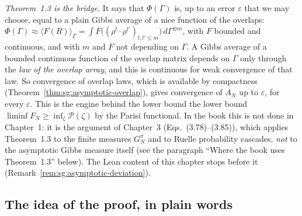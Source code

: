 \emph{Theorem~1.3 is the bridge.} It says that $\Phi(\Gamma)$ is, up to an error $\varepsilon$ that we may choose, equal to a plain Gibbs average of a nice function of the overlaps:
$\Phi(\Gamma)\approx\langle F(R)\rangle_\Gamma=\int F\big((\rho^l\cdot\rho^{l'})_{l,l'\le m}\big)\,d\Gamma^{\otimes m}$, with $F$ bounded and continuous, and with $m$ and $F$ not depending on $\Gamma$.
A Gibbs average of a bounded continuous function of the overlap matrix depends on $\Gamma$ only through the \emph{law of the overlap array}, and this is continuous for weak convergence of that law.
So convergence of overlap laws, which is available by compactness (Theorem~\ref{thm:sg:asymptotic-overlap}), gives convergence of $A_N$ up to $\varepsilon$, for every $\varepsilon$. This is the engine behind the lower bound
the lower bound $\liminf F_N\ge\inf_\zeta\mathscr P(\zeta)$ by the Parisi functional. In the book this is not done in Chapter~1: it is the argument of Chapter~3 (Eqs.~(3.78)--(3.85)), which applies Theorem~1.3 to the finite measures $G^\pi_N$ and to Ruelle probability cascades, \emph{not} to the asymptotic Gibbs measure itself (see the paragraph ``Where the book uses Theorem~1.3'' below). The Lean content of this chapter stops before it (Remark~\ref{rem:sg:asymptotic-deviation}).

\subsection*{The idea of the proof, in plain words}

